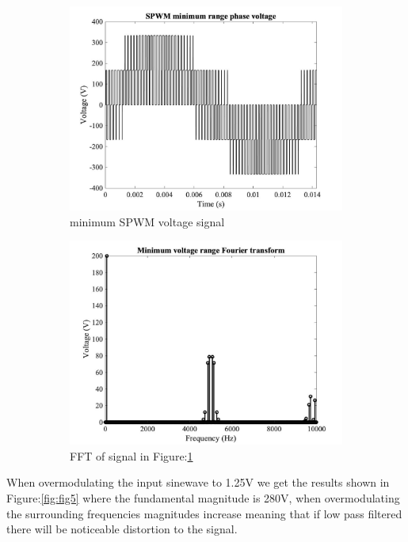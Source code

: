 \documentclass{article}
\begin{document}
\begin{figure}[H]
\begin{subfigure}{.5\textwidth}
  \centering
\includegraphics[scale=0.15]{2b1.jpg}
\caption{minimum SPWM voltage signal}
\label{fig:2b1a}
\end{subfigure}%
\begin{subfigure}{.5\textwidth}
  \centering
\includegraphics[scale=0.15]{2b2.jpg}
\caption{FFT of signal in Figure:\ref{fig:2b1a}}
\label{fig:2b1b}
\end{subfigure}
\caption{}
\label{fig:fig4}
\end{figure}
When overmodulating the input sinewave to 1.25V we get the results shown in Figure:\ref{fig:fig5} where the fundamental magnitude is 280V, when overmodulating the surrounding frequencies magnitudes increase meaning that if low pass filtered there will be noticeable distortion to the signal.
\end{document}
